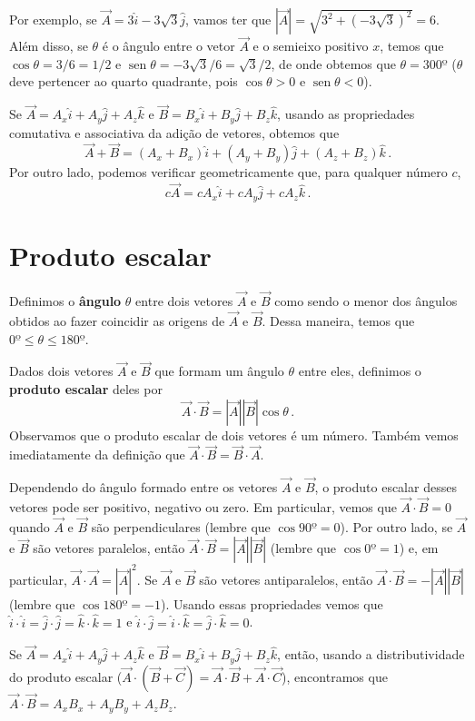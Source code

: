 \documentclass[12pt, a4paper]{article}
\DeclareMathOperator{\sen}{sen}
\begin{document}
Por exemplo, se $\vec A=3\hat i-3\sqrt{3}\hat j$, vamos ter que $|\vec A|=\sqrt{3^2+(-3\sqrt{3})^2}=6$. Além disso, se $\theta$ é o ângulo entre o vetor $\vec A$ e o semieixo positivo $x$, temos que $\cos\theta=3/6=1/2$ e $\sen\theta=-3\sqrt{3}/6=\sqrt{3}/2$, de onde obtemos que $\theta=300º$ ($\theta$ deve pertencer ao quarto quadrante, pois $\cos\theta>0$ e $\sen\theta<0$).

Se $\vec A=A_x\hat i+A_y\hat j+A_z\hat k$ e $\vec B=B_x\hat i+B_y\hat j+B_z\hat k$, usando as propriedades comutativa e associativa da adição de vetores, obtemos que
$$\vec A+\vec B=(A_x+B_x)\hat i+(A_y+B_y)\hat j+(A_z+B_z)\hat k\,.$$
Por outro lado, podemos verificar geometricamente que, para qualquer número $c$, 
$$c\vec A=cA_x\hat i+cA_y\hat j+cA_z\hat k\,.$$

\section{Produto escalar}

Definimos o \textbf{ângulo} $\theta$ entre dois vetores $\vec A$ e $\vec B$ como sendo o menor dos ângulos obtidos ao fazer coincidir as origens de $\vec A$ e $\vec B$. Dessa maneira, temos que $0º\le \theta\le 180º$.

Dados dois vetores $\vec A$ e $\vec B$ que formam um ângulo $\theta$ entre eles, definimos o \textbf{produto escalar} deles por
$$\vec A\cdot\vec B=|\vec A||\vec B|\cos\theta\,.$$
Observamos que o produto escalar de dois vetores é um número. Também vemos imediatamente da definição que $\vec A\cdot\vec B=\vec B\cdot\vec A$.

Dependendo do ângulo formado entre os vetores $\vec A$ e $\vec B$, o produto escalar desses vetores pode ser positivo, negativo ou zero. Em particular, vemos que $\vec A\cdot\vec B=0$ quando $\vec A$ e $\vec B$ são perpendiculares (lembre que $\cos 90º=0$). Por outro lado, se $\vec A$ e $\vec B$ são vetores paralelos, então $\vec A\cdot\vec B=|\vec A||\vec B|$ (lembre que $\cos 0º=1$) e, em particular, $\vec A\cdot\vec A=|\vec A|^2$. Se $\vec A$ e $\vec B$ são vetores antiparalelos, então $\vec A\cdot\vec B=-|\vec A||\vec B|$ (lembre que $\cos180º=-1$). Usando essas propriedades vemos que $\hat i\cdot\hat i=\hat j\cdot\hat j=\hat k\cdot\hat k=1$ e $\hat i\cdot\hat j=\hat i\cdot \hat k=\hat j\cdot\hat k=0$.

Se $\vec A=A_x\hat i+A_y\hat j+A_z\hat k$ e $\vec B=B_x\hat i+B_y\hat j+B_z\hat k$, então, usando a distributividade do produto escalar ($\vec A\cdot(\vec B+\vec C)=\vec A\cdot\vec B+\vec A\cdot\vec C$), encontramos que $\vec A\cdot\vec B=A_xB_x+A_yB_y+A_zB_z$.
\end{document}
